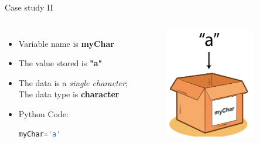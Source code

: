 \documentclass[10pt,xcolor={table,dvipsnames},t]{beamer}
\begin{document}
\begin{frame}[fragile]{Case study II}
  \begin{columns}
    \begin{itemize}
      \item Variable name is \textbf{myChar}
      \item The value stored is \textbf{"a"}
      \item The data is a \textit{single character}; The data type is \textbf{character}
      \item Python Code:\\\begin{lstlisting}[language=python]
    myChar='a'\end{lstlisting}
    \end{itemize}
    \begin{figure}
      \includegraphics[width=0.8\textwidth]{img/variable-chr.png}
    \end{figure}
  \end{columns}
\end{frame}
\end{document}
